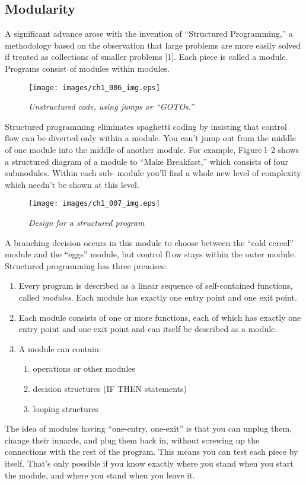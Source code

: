\subsection*{Modularity}

A significant advance arose with the invention of {}``Structured
Programming,'' a methodology based on the observation that large problems
are more easily solved if treated as collections of smaller problems
{[}1{]}. Each piece is called a module. Programs consist of modules
within modules.

%
\begin{figure}

\caption{\emph{Unstructured code, using jumps or {}``GOTOs.''}}

\texttt{[image: images/ch1\_006\_img.eps]}
\end{figure}


Structured programming eliminates spaghetti coding by insisting that
control flow can be diverted only within a module. You can't jump
out from the middle of one module into the middle of another module.
For example, Figure l--2 shows a structured diagram of a module to
{}``Make Breakfast,'' which consists of four submodules. Within each
sub- module you'll find a whole new level of complexity which needn't
be shown at this level.

%
\begin{figure}

\caption{\emph{Design for a structured program}}

\texttt{[image: images/ch1\_007\_img.eps]}
\end{figure}
A branching decision occurs in this module to choose between the {}``cold
cereal'' module and the {}``eggs'' module, but control f1ow stays
within the outer module. Structured programming has three premises:

\begin{enumerate}
\item Every program is described as a linear sequence of self-contained
functions, called \emph{modules}. Each module has exactly one entry
point and one exit point.
\item Each module consists of one or more functions, each of which has exactly
one entry point and one exit point and can itself be described as
a module.
\item A module can contain:

\begin{enumerate}
\item operations or other modules
\item decision structures (IF THEN statements)
\item looping structures
\end{enumerate}
\end{enumerate}
The idea of modules having {}``one-entry, one-exit'' is that you
can unplug them, change their innards, and plug them back in, without
screwing up the connections with the rest of the program. This means
you can test each piece by itself. That's only possible if you know
exactly where you stand when you start the module, and where you stand
when you leave it.

